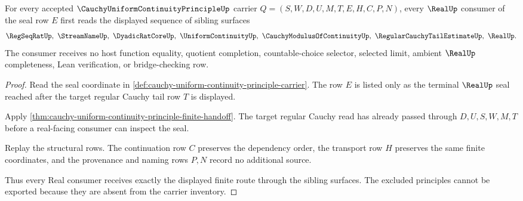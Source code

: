 \begin{theorem}
\label{thm:cauchy-uniform-continuity-principle-real-boundary}
For every accepted $\CauchyUniformContinuityPrincipleUp$ carrier $Q=(S,W,D,U,M,T,E,H,C,P,N)$, every $\RealUp$ consumer of the seal row $E$ first reads the displayed sequence of sibling surfaces
$$
\RegSeqRatUp,\ \StreamNameUp,\ \DyadicRatCoreUp,\ \UniformContinuityUp,\ \CauchyModulusOfContinuityUp,\ \RegularCauchyTailEstimateUp,\ \RealUp .
$$
The consumer receives no host function equality, quotient completion, countable-choice selector, selected limit, ambient $\RealUp$ completeness, Lean verification, or bridge-checking row.
\end{theorem}
\begin{proof}
Read the seal coordinate in \autoref{def:cauchy-uniform-continuity-principle-carrier}. The row $E$ is listed only as the terminal $\RealUp$ seal reached after the target regular Cauchy tail row $T$ is displayed.

Apply \autoref{thm:cauchy-uniform-continuity-principle-finite-handoff}. The target regular Cauchy read has already passed through $D,U,S,W,M,T$ before a real-facing consumer can inspect the seal.

Replay the structural rows. The continuation row $C$ preserves the dependency order, the transport row $H$ preserves the same finite coordinates, and the provenance and naming rows $P,N$ record no additional source.

Thus every Real consumer receives exactly the displayed finite route through the sibling surfaces. The excluded principles cannot be exported because they are absent from the carrier inventory.
\end{proof}


